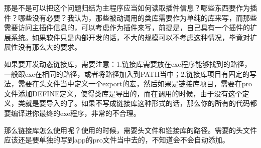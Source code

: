 那是不是可以把这个问题归结为主程序应当如何读取插件信息？哪些东西要作为插件？哪些没有必要？我认为，那些被动调用的类库需要作为单纯的库来写，而那些需要访问主插件信息的，可以考虑作为插件来写，前提是，自己具有一个插件的扩展系统。如果软件只是内部开发的话，不大的规模可以不考虑这种情况，毕竟对扩展性没有那么大的要求。

如果要开发动态链接库，需要注意：1.链接库需要放在exe程序能够找到的路径，一般跟exe在相同的路径，或者将路径加入到PATH当中；2.链接库项目有固定的写法，需要在头文件当中定义一个export的宏，然后如果是链接库项目，需要在pro文件添加DEFINE定义，使得类库是导出的，而在调用的时候，由于没有这个定义，类就是要导入的了。如果不写成链接库这种形式的话，那么你的所有的代码都要编译进你最终的exe程序，非常的不合理。

那么链接库怎么使用呢？使用的时候，需要头文件和链接库的路径。需要的头文件应该还是要单独的写到app的pro文件当中去的，不知道会不会自动添加。